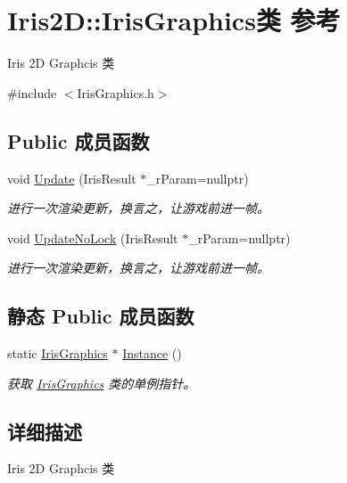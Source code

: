 \hypertarget{class_iris2_d_1_1_iris_graphics}{}\section{Iris2D\+:\+:Iris\+Graphics类 参考}
\label{class_iris2_d_1_1_iris_graphics}


Iris 2D Graphcis 类  




{\ttfamily \#include $<$Iris\+Graphics.\+h$>$}

\subsection*{Public 成员函数}
\begin{DoxyCompactItemize}
\item 
void \hyperlink{class_iris2_d_1_1_iris_graphics_aa25debfc9a08d7084f48711a6bffdc4d}{Update} (Iris\+Result $\ast$\+\_\+r\+Param=nullptr)
\begin{DoxyCompactList}\small\item\em 进行一次渲染更新，换言之，让游戏前进一帧。 \end{DoxyCompactList}\item 
void \hyperlink{class_iris2_d_1_1_iris_graphics_adbbca919748bfdd9b84958414debc588}{Update\+No\+Lock} (Iris\+Result $\ast$\+\_\+r\+Param=nullptr)
\begin{DoxyCompactList}\small\item\em 进行一次渲染更新，换言之，让游戏前进一帧。 \end{DoxyCompactList}\end{DoxyCompactItemize}
\subsection*{静态 Public 成员函数}
\begin{DoxyCompactItemize}
\item 
static \hyperlink{class_iris2_d_1_1_iris_graphics}{Iris\+Graphics} $\ast$ \hyperlink{class_iris2_d_1_1_iris_graphics_a25533fd69478336d60c5b1f639802d3a}{Instance} ()
\begin{DoxyCompactList}\small\item\em 获取 \hyperlink{class_iris2_d_1_1_iris_graphics}{Iris\+Graphics} 类的单例指针。 \end{DoxyCompactList}\end{DoxyCompactItemize}


\subsection{详细描述}
Iris 2D Graphcis 类 


